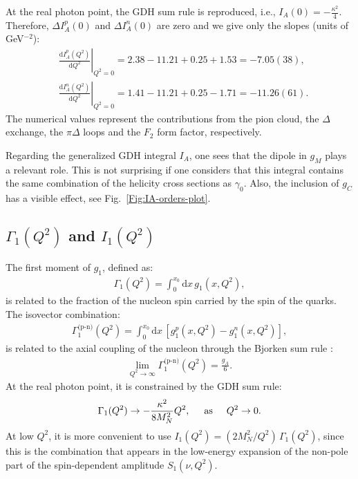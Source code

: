 \documentclass[twocolumn,prc,showpacs,nofootinbib,preprintnumbers,amsmath,amssymb,superscriptaddress]{revtex4-1}
\def\dd{\mathrm{d}}
\begin{document}
At the real photon point, the GDH sum rule is reproduced, i.e., $I_A (0) = - \frac{\kappa^2}{4}$. Therefore, $\Delta I_A^p(0)$ and $\Delta I_A^n(0)$ are zero and we give only the slopes (units of GeV$^{-2}$):
\begin{align}
&\left.\frac{\dd I_A^p (Q^2)}{\dd Q^2}\right|_{Q^2=0}= 2.38 -11.21 + 0.25 +1.53 =-7.05(38),\\
&\left.\frac{\dd I_A^n (Q^2)}{\dd Q^2}\right|_{Q^2=0}=  1.41 -11.21 + 0.25  -1.71= -11.26(61).
\end{align}
The numerical values represent the contributions from the pion cloud, the $\Delta$ exchange, the $\pi \Delta$ loops and the $F_2$ form factor, respectively.


Regarding the generalized GDH integral $I_A$, one sees that the dipole in $g_M$ plays a relevant role. 
This is not surprising if one considers that this integral contains the same combination of the helicity cross sections as $\gamma_0$. Also, the inclusion of $g_C$ has a visible effect, see Fig.~\ref{Fig:IA-orders-plot}.



\subsection{ $\Gamma_1(Q^2)$ and $I_1(Q^2)$} 

The first moment of $g_1$, defined as:
\begin{align}
 \Gamma_1(Q^2) = \int^{x_0}_0\!\! \dd x\, g_1(x,Q^2), 
\end{align}
is related to the fraction of the nucleon spin carried by the spin of the quarks. 
 The isovector combination:
 \begin{align}
 \Gamma^{\text{(p-n)}}_1(Q^2) = \int^{x_0}_0\!\! \dd x\, [g^p_1(x,Q^2) - g^n_1(x,Q^2) ], 
\end{align}
is related to the axial coupling of the nucleon through the Bjorken sum rule \cite{Bjorken:1966jh,Bjorken:1969mm}:
 \begin{align}
\lim_{Q^2 \to \infty} \Gamma^{\text{(p-n)}}_1(Q^2) = \frac{g_A}{6}.
\end{align}
At the real photon point, it is constrained by the GDH sum rule:
\begin{align}
 \Gamma_1(Q^2) \to - \frac{\kappa^2}{8 M_N^2} Q^2, \text{\hspace{0.5cm}as\hspace{0.5cm}} Q^2 \to 0.
\end{align}
At low $Q^2$, it is more convenient to use $I_1(Q^2) = (2M_N^2/Q^2)\,\Gamma_1(Q^2)$, since this is the combination that appears in the low-energy expansion of the non-pole part of the spin-dependent amplitude $S_1(\nu, Q^2)$.
\end{document}
